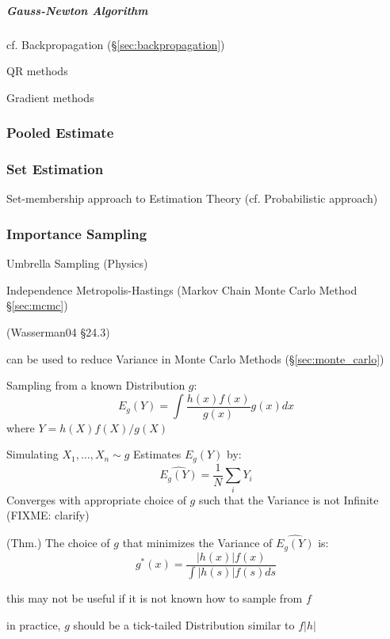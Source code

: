 \subparagraph{Gauss-Newton Algorithm}\label{sec:gauss_newton}\hfill

cf. Backpropagation (\S\ref{sec:backpropagation})

QR methods

Gradient methods



\subsubsection{Pooled Estimate}\label{sec:pooled_estimate}




\subsubsection{Set Estimation}\label{sec:set_estimation}

Set-membership approach to Estimation Theory (cf. Probabilistic approach)



\subsubsection{Importance Sampling}\label{sec:importance_sampling}

Umbrella Sampling (Physics)

\fist Independence Metropolis-Hastings (Markov Chain Monte Carlo Method
\S\ref{sec:mcmc})

(Wasserman04 \S24.3)

can be used to reduce Variance in Monte Carlo Methods (\S\ref{sec:monte_carlo})

Sampling from a known Distribution $g$:
\[
  E_g(Y) = \int \frac{h(x)f(x)}{g(x)} g(x) dx
\]
where $Y = h(X)f(X)/g(X)$

Simulating $X_1, \ldots, X_n \sim g$ Estimates $E_g(Y)$ by:
\[
  \hat{E_g(Y)} = \frac{1}{N}\sum_i Y_i
\]
Converges with appropriate choice of $g$ such that the Variance is not Infinite
(FIXME: clarify)

(Thm.) The choice of $g$ that minimizes the Variance of $\hat{E_g(Y)}$ is:
\[
  g^*(x) = \frac{|h(x)| f(x)}{\int|h(s)| f(s) ds}
\]

this may not be useful if it is not known how to sample from $f$

in practice, $g$ should be a tick-tailed Distribution similar to $f|h|$



